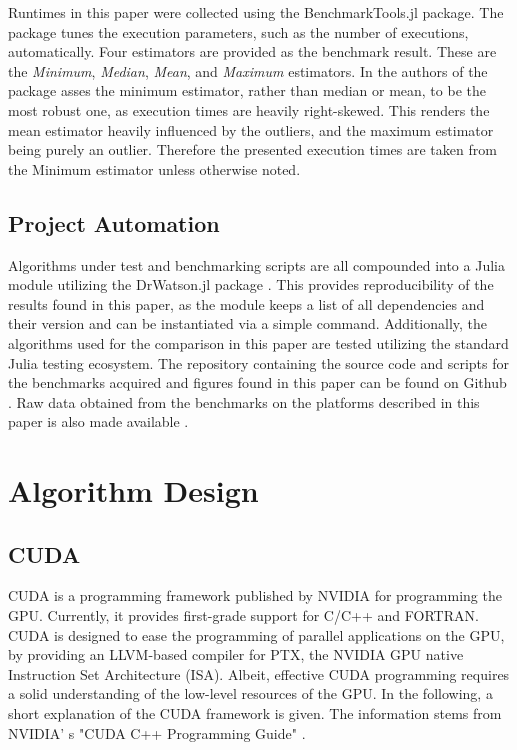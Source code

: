 \documentclass{juliacon}
\begin{document}
Runtimes in this paper were collected using the BenchmarkTools.jl package. The package tunes the execution parameters, such as the number of executions, automatically. Four estimators are provided as the benchmark result. These are the \emph{Minimum}, \emph{Median}, \emph{Mean}, and \emph{Maximum} estimators. In \cite{Chen2016} the authors of the package asses the minimum estimator, rather than median or mean, to be the most robust one, as execution times are heavily right-skewed. This renders the mean estimator heavily influenced by the outliers, and the maximum estimator being purely an outlier. Therefore the presented execution times are taken from the Minimum estimator unless otherwise noted.

\subsection*{Project Automation}
Algorithms under test and benchmarking scripts are all compounded into a Julia module utilizing the DrWatson.jl package \cite{Datseris2020}. This provides reproducibility of the results found in this paper, as the module keeps a list of all dependencies and their version and can be instantiated via a simple command. Additionally, the algorithms used for the comparison in this paper are tested utilizing the standard Julia testing ecosystem. The repository containing the source code and scripts for the benchmarks acquired and figures found in this paper can be found on Github \cite{Ozmaden2022}. Raw data obtained from the benchmarks on the platforms described in this paper is also made available \cite{Ozmaden2022_2}.

\section{Algorithm Design}\label{sec:algorithm-design}
\subsection*{CUDA}
CUDA is a programming framework published by NVIDIA for programming the GPU. Currently, it provides first-grade support for C/C++ and FORTRAN. CUDA is designed to ease the programming of parallel applications on the GPU, by providing an LLVM-based compiler for PTX, the NVIDIA GPU native Instruction Set Architecture (ISA). Albeit, effective CUDA programming requires a solid understanding of the low-level resources of the GPU. In the following, a short explanation of the CUDA framework is given. The information stems from NVIDIA'
s "CUDA C++ Programming Guide" \cite{NVIDIA2022}.
\end{document}

